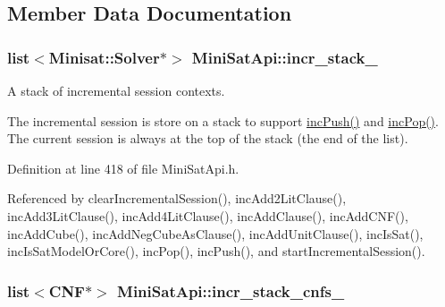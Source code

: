 \subsection{Member Data Documentation}
\hypertarget{classMiniSatApi_ab9dcac91d11eef23cc40d7478464c414}{
\subsubsection[{incr\-\_\-stack\-\_\-}]{\setlength{\rightskip}{0pt plus 5cm}list$<$Minisat\-::\-Solver$\ast$$>$ Mini\-Sat\-Api\-::incr\-\_\-stack\-\_\-\hspace{0.3cm}{\ttfamily [protected]}}}\label{classMiniSatApi_ab9dcac91d11eef23cc40d7478464c414}


A stack of incremental session contexts. 

The incremental session is store on a stack to support \hyperlink{classMiniSatApi_a27013ace25320f68252bef5ba9f2e9ad}{inc\-Push()} and \hyperlink{classMiniSatApi_af388f97db15f77baeb420a8fef74ca6a}{inc\-Pop()}. The current session is always at the top of the stack (the end of the list). 

Definition at line 418 of file Mini\-Sat\-Api.\-h.



Referenced by clear\-Incremental\-Session(), inc\-Add2\-Lit\-Clause(), inc\-Add3\-Lit\-Clause(), inc\-Add4\-Lit\-Clause(), inc\-Add\-Clause(), inc\-Add\-C\-N\-F(), inc\-Add\-Cube(), inc\-Add\-Neg\-Cube\-As\-Clause(), inc\-Add\-Unit\-Clause(), inc\-Is\-Sat(), inc\-Is\-Sat\-Model\-Or\-Core(), inc\-Pop(), inc\-Push(), and start\-Incremental\-Session().

\hypertarget{classMiniSatApi_aca2da2d02879e4a05c09124ff84cc4cd}{
\subsubsection[{incr\-\_\-stack\-\_\-cnfs\-\_\-}]{\setlength{\rightskip}{0pt plus 5cm}list$<${\bf C\-N\-F}$\ast$$>$ Mini\-Sat\-Api\-::incr\-\_\-stack\-\_\-cnfs\-\_\-\hspace{0.3cm}{\ttfamily [protected]}}}\label{classMiniSatApi_aca2da2d02879e4a05c09124ff84cc4cd}


